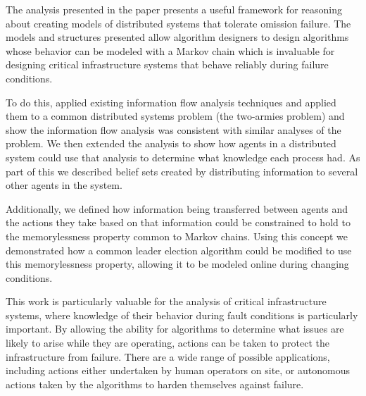 The analysis presented in the paper presents a useful framework for reasoning about creating models of distributed systems that tolerate omission failure. The models and structures presented allow algorithm designers to design algorithms whose behavior can be modeled with a Markov chain which is invaluable for designing critical infrastructure systems that behave reliably during failure conditions.

To do this, applied existing information flow analysis techniques and applied them to a common distributed systems problem (the two-armies problem) and show the information flow analysis was consistent with similar analyses of the problem. We then extended the analysis to show how agents in a distributed system could use that analysis to determine what knowledge each process had. As part of this we described belief sets created by distributing information to several other agents in the system.

Additionally, we defined how information being transferred between agents and the actions they take based on that information could be constrained to hold to the memorylessness property common to Markov chains. Using this concept we demonstrated how a common leader election algorithm could be modified to use this memorylessness property, allowing it to be modeled online during changing conditions.

This work is particularly valuable for the analysis of critical infrastructure systems, where knowledge of their behavior during fault conditions is particularly important. By allowing the ability for algorithms to determine what issues are likely to arise while they are operating, actions can be taken to protect the infrastructure from failure. There are a wide range of possible applications, including actions either undertaken by human operators on site, or autonomous actions taken by the algorithms to harden themselves against failure.

